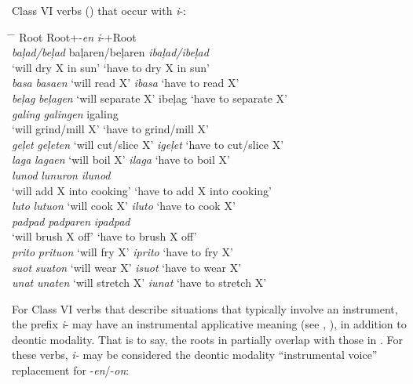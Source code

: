 \ea
\label{bkm:Ref447111587}
\label{bkm:Ref148965704}
Class VI verbs () that occur with \textit{i}{}-: \begin{tabbing}
\hspace{2cm} \= \hspace{4cm} \= \kill
Root \> Root+-\textit{en} \> \textit{i}{}-+Root \\
\textit{baļad/beļad } \>  baļaren/beļaren \> \textit{ibaļad/ibeļad} \\
                     \>  ‘will dry X in sun’ \> ‘have to dry X in sun’ \\
\textit{basa } \>    \textit{basaen} ‘will read X’ \> \textit{ibasa} ‘have to read X’ \\
\textit{beļag } \>   \textit{beļagen} ‘will separate X’ \> ibeļag ‘have to separate X’ \\
\textit{galing } \>  \textit{galingen} \> igaling \\
                 \>  ‘will grind/mill X’ \> ‘have to grind/mill X’ \\
\textit{geļet } \>  \textit{geļeten} ‘will cut/slice X’ \> \textit{igeļet} ‘have to cut/slice X’ \\
\textit{laga } \>  \textit{lagaen} ‘will boil X’ \> \textit{ilaga} ‘have to boil X’ \\
\textit{lunod } \>  \textit{lunuron} \> \textit{ilunod} \\
               \>  ‘will add X into cooking’ \>  ‘have to add X into cooking’ \\
\textit{luto } \>  \textit{lutuon} ‘will cook X’ \> \textit{iluto} ‘have to cook X’ \\
\textit{padpad } \>  \textit{padparen} \> \textit{ipadpad} \\
                 \>  ‘will brush X off’ \> ‘have to brush X off’ \\
\textit{prito } \>  \textit{prituon} ‘will fry X’ \> \textit{iprito} ‘have to fry X’ \\
\textit{suot } \>  \textit{suuton} ‘will wear X’ \> \textit{isuot} ‘have to wear X’ \\
\textit{unat } \>  \textit{unaten} ‘will stretch X’ \> \textit{iunat} ‘have to stretch X’
\end{tabbing}
\z

For Class VI verbs that describe situations that typically involve an instrument, the prefix \textit{i}{}- may have an instrumental applicative meaning (see , ), in addition to deontic modality. That is to say, the roots in  partially overlap with those in . For these verbs, \textit{i-} may be considered the deontic modality “instrumental voice” replacement for -\textit{en}/-\textit{on}:

